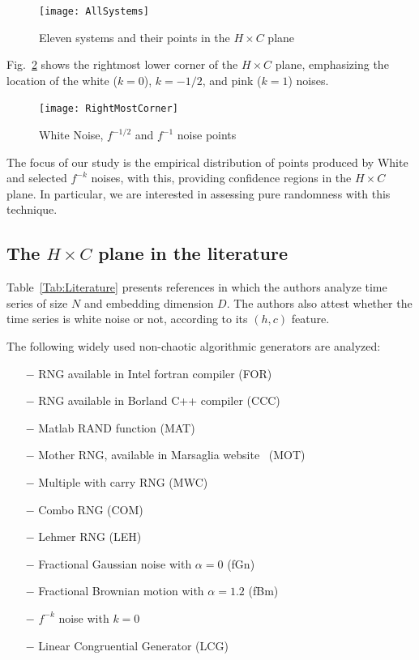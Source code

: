 \begin{figure}[H]
\centering
\texttt{[image: AllSystems]}
\caption{Eleven systems and their points in the $H\times C$ plane}\label{fig:AllSystems}
\end{figure}

Fig.~\ref{fig:RightMostCorner} shows the rightmost lower corner of the $H\times C$ plane, emphasizing the location of the white ($k=0$), $k=-1/2$, and pink ($k=1$) noises.

\begin{figure}[H]
\centering
\texttt{[image: RightMostCorner]}
\caption{White Noise, $f^{-1/2}$ and $f^{-1}$ noise points}\label{fig:RightMostCorner}
\end{figure}

The focus of our study is the empirical distribution of points produced by White and selected $f^{-k}$ noises, with this, providing confidence regions in the $H\times C$ plane.
In particular, we are interested in assessing pure randomness with this technique.

\subsection{The $H\times C$ plane in the literature}

Table~\ref{Tab:Literature} presents references in which the authors analyze time series of size $N$ and embedding dimension $D$.
The authors also attest whether the time series is white noise or not, according to its $(h,c)$ feature.

The following widely used non-chaotic algorithmic generators are analyzed:
\begin{itemize}
    \item[$-$] RNG available in Intel fortran compiler (FOR)
    \item[$-$] RNG available in Borland C++ compiler (CCC)
    \item[$-$] Matlab RAND function (MAT)
    \item[$-$] Mother RNG, available in Marsaglia website~\cite{marsaglia1994yet} (MOT)
    \item[$-$] Multiple with carry RNG (MWC)~\cite{marsaglia1994yet}
    \item[$-$] Combo RNG (COM)~\cite{marsaglia1994yet}
    \item[$-$] Lehmer RNG (LEH)~\cite{payne1969coding}
    \item[$-$] Fractional Gaussian noise with $\alpha = 0$ (fGn)
    \item[$-$] Fractional Brownian motion with $\alpha = 1.2$ (fBm)
    \item[$-$] $f^{-k}$ noise with $k = 0$
    \item[$-$] Linear Congruential Generator (LCG)~\cite{knuth1997sorting}
\end{itemize}

